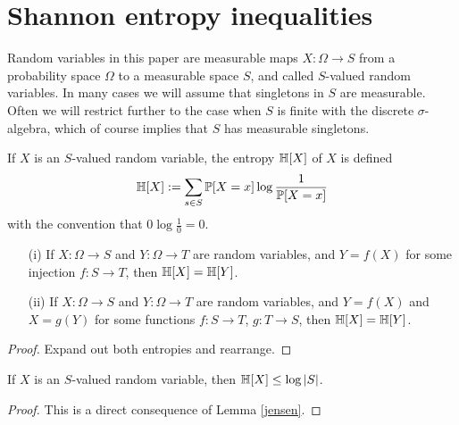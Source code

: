 \chapter{Shannon entropy inequalities}

Random variables in this paper are measurable maps $X : \Omega \to S$ from a probability space $\Omega$ to a measurable space $S$, and called $S$-valued random variables. In many cases we will assume that singletons in $S$ are measurable.  Often we will restrict further to the case when $S$ is finite with the discrete $\sigma$-algebra, which of course implies that $S$ has measurable singletons.

\begin{definition}[Entropy]
  \label{entropy-def}
  \leanok
  If $X$ is an $S$-valued random variable, the entropy $\mathbb{H}[X]$ of $X$ is defined
  $$ \mathbb{H}[X] := \sum_{s \in S} \mathbb{P}[X=x] \log \frac{1}{\mathbb{P}[X=x]}$$
  with the convention that $0 \log \frac{1}{0} = 0$.
\end{definition}

\begin{lemma}\label{relabeled-entropy} \leanok
  \begin{itemize}
\item[(i)]   If $X: \Omega \to S$ and $Y: \Omega \to T$ are random variables, and $Y = f(X)$ for some injection $f: S \to T$, then $\mathbb{H}[X] = \mathbb{H}[Y]$.
\item[(ii)]   If $X: \Omega \to S$ and $Y: \Omega \to T$ are random variables, and $Y = f(X)$ and $X = g(Y)$ for some functions $f: S \to T$, $g: T \to S$, then $\mathbb{H}[X] = \mathbb{H}[Y]$.
\end{itemize}
\end{lemma}

\begin{proof} \leanok Expand out both entropies and rearrange.
\end{proof}

\begin{lemma}\label{jensen-bound}
  \leanok
  If $X$ is an $S$-valued random variable, then $\mathbb{H}[X] \leq \log |S|$.
\end{lemma}

\begin{proof}\leanok
  This is a direct consequence of Lemma \ref{jensen}.
\end{proof}

